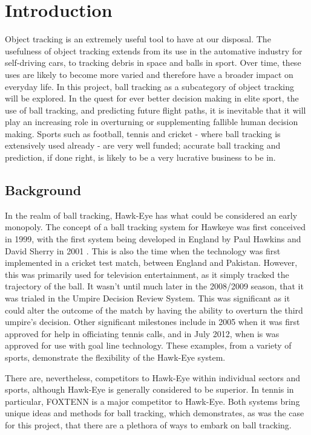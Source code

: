 \documentclass{article}
\begin{document}
\section{Introduction}

Object tracking is an extremely useful tool to have at our disposal. The usefulness of object tracking extends from its use in the automative industry for self-driving cars, to tracking debris in space and balls in sport. Over time, these uses are likely to become more varied and therefore have a broader impact on everyday life. In this project, ball tracking as a subcategory of object tracking will be explored. In the quest for ever better decision making in elite sport, the use of ball tracking, and predicting future flight paths, it is inevitable that it will play an increasing role in overturning or supplementing fallible human decision making. Sports such as football, tennis and cricket - where ball tracking is extensively used already - are very well funded; accurate ball tracking and prediction, if done right, is likely to be a very lucrative business to be in.

\subsection{Background}
In the realm of ball tracking, Hawk-Eye has what could be considered an early monopoly. The concept of a ball tracking system for Hawkeye was first conceived in 1999, with the first system being developed in England by Paul Hawkins and David Sherry in 2001 \cite{1}. This is also the time when the technology was first implemented in a cricket test match, between England and Pakistan. However, this was primarily used for television entertainment, as it simply tracked the trajectory of the ball. It wasn’t until much later in the 2008/2009 season, that it was trialed in the Umpire Decision Review System. This was significant as it could alter the outcome of the match by having the ability to overturn the third umpire’s decision. Other significant milestones include in 2005 when it was first approved for help in officiating tennis calls, and in July 2012, when is was approved for use with goal line technology. These examples, from a variety of sports, demonstrate the flexibility of the Hawk-Eye system. 

There are, nevertheless, competitors to Hawk-Eye within individual sectors and sports, although Hawk-Eye is generally considered to be superior. In tennis in particular, FOXTENN is a major competitor to Hawk-Eye. Both systems bring unique ideas and methods for ball tracking, which demonstrates, as was the case for this project, that there are a plethora of ways to embark on ball tracking. 
\end{document}

